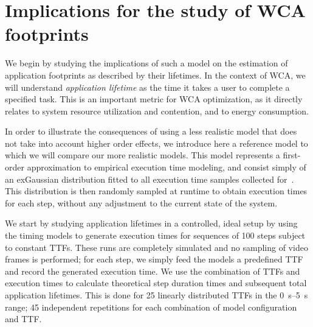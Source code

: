 \section{Implications for the study of \gls{WCA} footprints}\label{sec:implications:footprint}


We begin by studying the implications of such a model on the estimation of application footprints as described by their lifetimes.
In the context of \gls{WCA}, we will understand \emph{application lifetime} as the time it takes a user to complete a specified task.
This is an important metric for \gls{WCA} optimization, as it directly relates to system resource utilization and contention, and to energy consumption.

In order to illustrate the consequences of using a less realistic model that does not take into account higher order effects, we introduce here a reference model to which we will compare our more realistic models.
This model represents a first-order approximation to empirical execution time modeling, and consist simply of an \gls{exGaussian} distribution fitted to all execution time samples collected for~\cite{olguinmunoz2021impact}.
This distribution is then randomly sampled at runtime to obtain execution times for each step, without any adjustment to the current state of the system.

We start by studying application lifetimes in a controlled, ideal setup by using the timing models to generate execution times for sequences of \num{100} steps subject to constant \glspl{TTF}.
These runs are completely simulated and no sampling of video frames is performed; for each step, we simply feed the models a predefined \gls{TTF} and record the generated execution time.
We use the combination of \glspl{TTF} and execution times to calculate theoretical step duration times and subsequent total application lifetimes.
This is done for \num{25} linearly distributed \glspl{TTF} in the \SIrange[]{0}{5}{\second} range; \num{45} independent repetitions for each combination of model configuration and \gls{TTF}.

